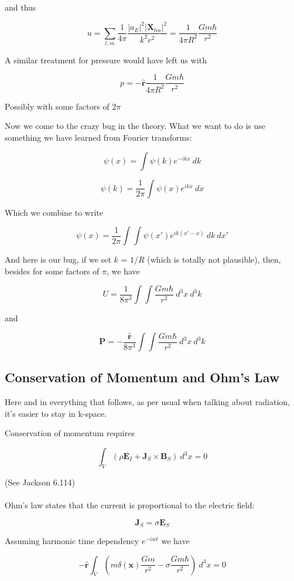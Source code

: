 \documentclass {article}
\renewcommand\vec{\mathbf}
\let\OldHat\hat
\renewcommand{\hat}[1]{\OldHat{\mathbf{#1}}}
\begin{document}
and thus 

$$u  = \sum_{l, m}   \frac 1 {4\pi}  \frac {|a_E|^2 |\vec X_{lm} |^2}{k^2 r^2}  =  \frac 1 {4 \pi R^2} \frac {Gm \hbar} {r^2} $$

A similar treatment for pressure would have left us with 

$$p = - \hat r \frac 1 {4 \pi R^2} \frac {Gm \hbar} {r^2} $$

Possibly with some factors of $2 \pi$

Now we come to the crazy bug in the theory. What we want to do is use something we have learned from Fourier transforms:

$$\psi (x) = \int \psi(k)e^{-ikx} ~ dk $$

$$\psi ( k ) = \frac 1 {2 \pi} \int \psi(x) e ^{ikx} ~ dx $$

Which we combine to write

$$\psi(x) = \frac 1 {2 \pi} \int \int \psi (x') e^{ik(x' - x)} ~dk ~dx'$$


And here is our bug, if we set $k$ = $1/R$ (which is totally not plausible), then, besides for some factors of  $\pi$, we have

$$U =\frac 1 {8 \pi^3} \int \int \frac {Gm\hbar}{r^2} ~d^3x ~ d^3k$$

and 

$$\vec P = -\frac {\hat r} {8 \pi^3} \int \int \frac {Gm\hbar}{r^2} ~d^3x ~ d^3k$$
 

\newpage


\subsection {Conservation of Momentum and Ohm's Law}

Here and in everything that follows, as per usual when talking about radiation, it's easier to stay in k-space.

Conservation of momentum requires

$$\int_V \left(  \rho \vec E_I  + \vec J_S \times \vec B_S \right) ~ d^3x  = 0 $$

(See Jackson 6.114)
\\
\\

Ohm's law states that the current is proportional to the electric field:

$$\vec J_S = \sigma \vec E_S$$ 

Assuming harmonic time dependency $e^{-iwt}$ we have

$$- \hat r \int_V \left(  m \delta (\vec x) \frac {Gm}{r^2}  - \sigma \frac {Gm \hbar} {r^2} \right) ~ d^3x  = 0 $$
\end{document}
